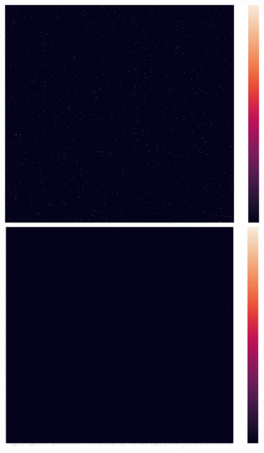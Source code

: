 \documentclass[12pt,%
               a4paper,%
               oneside,openany,%
               titlepage,%
               headinclude,footinclude,%
               BCOR5mm,%
               cleardoublepage=empty,%
               tablecaptionabove,%
               floatperchapter,
               ]{scrreprt}                 %
\begin{document}
\begin{figure}[ht]
  \begin{minipage}[b]{0.5\linewidth}
    \centering
    \includegraphics[width=.9\linewidth]{Figures/Matrix_rareearth.jpg}
    \vspace{4ex}
  \end{minipage}
  \begin{minipage}[b]{0.5\linewidth}
    \centering
    \includegraphics[width=.9\linewidth]{Figures/Matrix_afghanistan.jpg}
    \vspace{4ex}
  \end{minipage}
  \begin{minipage}[b]{0.5\linewidth}

\end{minipage}
\end{figure}
\end{document}
